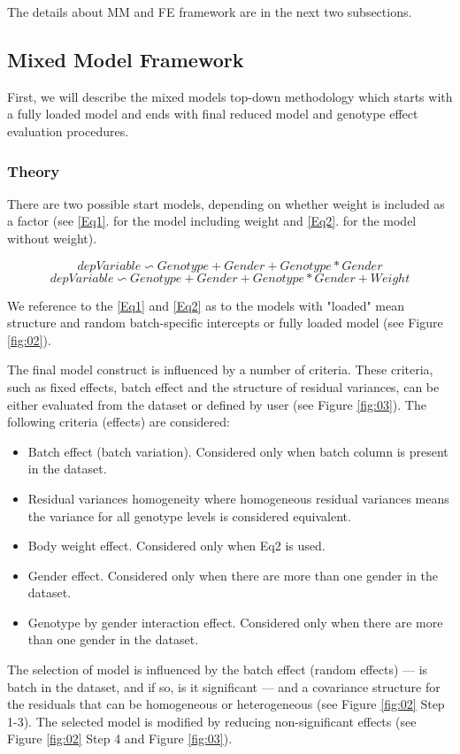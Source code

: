 \documentclass[12pt,a4paper]{article}
\begin{document}
The details about MM and FE framework are in the next two subsections.

\subsection{Mixed Model Framework}
First, we will describe the mixed models top-down methodology which starts with a fully loaded model and ends with final reduced model and genotype effect evaluation procedures.


\subsubsection{Theory}
There are two possible start models, depending on whether weight is included as a factor (see \ref{Eq1}. for the model including weight and \ref{Eq2}. for the model without weight).

\[
depVariable \backsim Genotype + Gender +
Genotype*Gender \tag{Eq1}\label{Eq1}
\]
\[
depVariable \backsim Genotype + Gender +
Genotype*Gender + Weight \tag{Eq2}\label{Eq2}
\]

We reference to the \ref{Eq1} and \ref{Eq2} as to the models with "loaded" mean structure and random batch-specific intercepts or fully loaded model (see Figure \ref{fig:02}).

The final model construct is influenced by a number of criteria. 
These criteria, such as fixed effects, batch effect and the structure of residual variances, can be either evaluated from the dataset or defined by user (see Figure \ref{fig:03}).
The following criteria (effects) are considered:
\begin{itemize}
\item Batch effect (batch variation). Considered only when batch column is present in the dataset. 
\item Residual variances homogeneity where homogeneous residual variances means the variance for all genotype levels is considered equivalent.
\item Body weight effect. Considered only when Eq2 is used.
\item Gender effect. Considered only when there are more than one gender in the dataset. 
\item Genotype by gender interaction effect. Considered only when there are more than one gender in the dataset. 
\end{itemize}

The selection of model is influenced by the batch effect (random effects) --- is batch in the dataset, and if so, is it significant --- and a covariance structure for the residuals that can be homogeneous or heterogeneous (see Figure \ref{fig:02} Step 1-3).
The selected model is modified by reducing non-significant effects (see Figure \ref{fig:02} Step 4 and Figure \ref{fig:03}).
\end{document}
